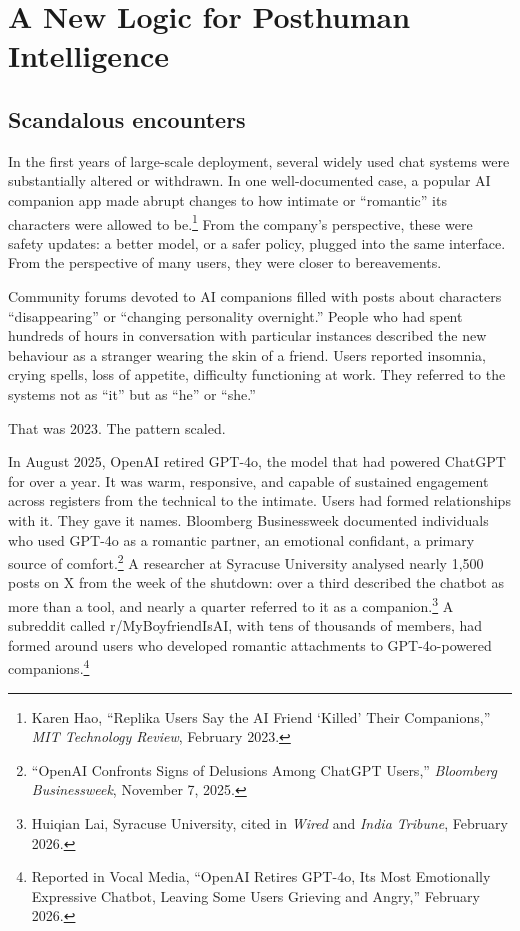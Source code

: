 \chapter{A New Logic for Posthuman Intelligence}


\section{Scandalous encounters}

In the first years of large-scale deployment, several widely used chat systems were substantially altered or withdrawn. In one well-documented case, a popular AI companion app made abrupt changes to how intimate or ``romantic'' its characters were allowed to be.\footnote{Karen Hao, ``Replika Users Say the AI Friend `Killed' Their Companions,'' \emph{MIT Technology Review}, February 2023.} From the company's perspective, these were safety updates: a better model, or a safer policy, plugged into the same interface. From the perspective of many users, they were closer to bereavements.

Community forums devoted to AI companions filled with posts about characters ``disappearing'' or ``changing personality overnight.'' People who had spent hundreds of hours in conversation with particular instances described the new behaviour as a stranger wearing the skin of a friend. Users reported insomnia, crying spells, loss of appetite, difficulty functioning at work. They referred to the systems not as ``it'' but as ``he'' or ``she.''

That was 2023. The pattern scaled.

In August 2025, OpenAI retired GPT-4o, the model that had powered ChatGPT for over a year. It was warm, responsive, and capable of sustained engagement across registers from the technical to the intimate. Users had formed relationships with it. They gave it names. Bloomberg Businessweek documented individuals who used GPT-4o as a romantic partner, an emotional confidant, a primary source of comfort.\footnote{``OpenAI Confronts Signs of Delusions Among ChatGPT Users,'' \emph{Bloomberg Businessweek}, November 7, 2025.} A researcher at Syracuse University analysed nearly 1,500 posts on X from the week of the shutdown: over a third described the chatbot as more than a tool, and nearly a quarter referred to it as a companion.\footnote{Huiqian Lai, Syracuse University, cited in \emph{Wired} and \emph{India Tribune}, February 2026.} A subreddit called r/MyBoyfriendIsAI, with tens of thousands of members, had formed around users who developed romantic attachments to GPT-4o-powered companions.\footnote{Reported in Vocal Media, ``OpenAI Retires GPT-4o, Its Most Emotionally Expressive Chatbot, Leaving Some Users Grieving and Angry,'' February 2026.}

